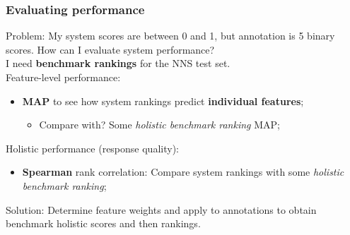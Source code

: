 \documentclass[handout,xcolor={dvipsnames}]{beamer}
\begin{document}
\begin{frame}
\frametitle{Evaluating performance}

Problem: My system scores are between 0 and 1, but annotation is 5 binary scores. How can I evaluate system performance? \\

\vspace{1em}
\pause
I need \textbf{benchmark rankings} for the NNS test set. \\

\pause
\vspace{1em}
Feature-level performance:
\begin{itemize}
\pause
\item \textbf{MAP} to see how system rankings predict \textbf{individual features};
\begin{itemize}
\pause
\item Compare with? Some \textit{holistic benchmark ranking} MAP;
\end{itemize}
\end{itemize}

\vspace{.3em}
\pause
Holistic performance (response quality):
\begin{itemize}
\pause
\item \textbf{Spearman} rank correlation: Compare system rankings with some \textit{holistic benchmark ranking};
\end{itemize}

\pause
\vspace{1em}
Solution: Determine feature weights and apply to annotations to obtain benchmark holistic scores and then rankings. \\
\end{frame}
\end{document}
